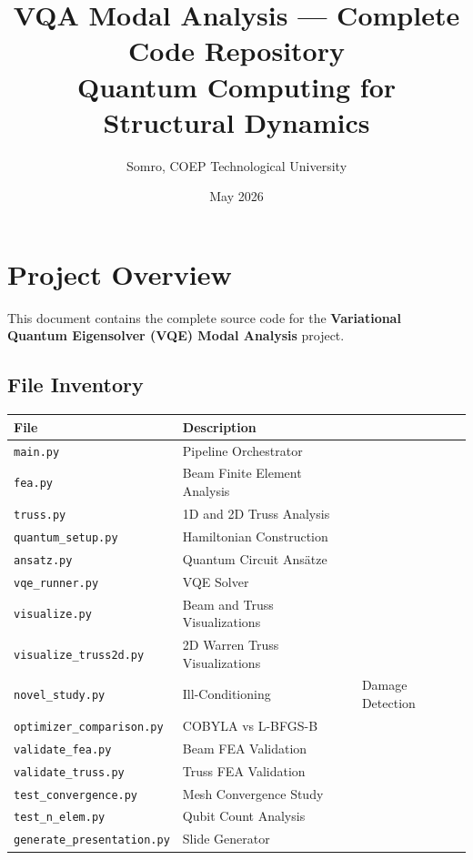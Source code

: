 \documentclass[12pt, a4paper]{article}
\title{\textbf{VQA Modal Analysis --- Complete Code Repository} \\
\large Quantum Computing for Structural Dynamics}
\author{Somro, COEP Technological University}
\date{May 2026}
\newcommand{\code}[1]{\texttt{\small #1}}
\begin{document}
\maketitle
\tableofcontents
\newpage

\section{Project Overview}
This document contains the complete source code for the \textbf{Variational Quantum Eigensolver (VQE) Modal Analysis} project.
\subsection{File Inventory}
\begin{table}[H]
\centering
\begin{tabular}{ll}
\toprule
\textbf{File} & \textbf{Description} \\
\midrule
\code{main.py} & Pipeline Orchestrator \\
\code{fea.py} & Beam Finite Element Analysis \\
\code{truss.py} & 1D and 2D Truss Analysis \\
\code{quantum_setup.py} & Hamiltonian Construction \\
\code{ansatz.py} & Quantum Circuit Ansätze \\
\code{vqe_runner.py} & VQE Solver \\
\code{visualize.py} & Beam and Truss Visualizations \\
\code{visualize_truss2d.py} & 2D Warren Truss Visualizations \\
\code{novel_study.py} & Ill-Conditioning & Damage Detection \\
\code{optimizer_comparison.py} & COBYLA vs L-BFGS-B \\
\code{validate_fea.py} & Beam FEA Validation \\
\code{validate_truss.py} & Truss FEA Validation \\
\code{test_convergence.py} & Mesh Convergence Study \\
\code{test_n_elem.py} & Qubit Count Analysis \\
\code{generate_presentation.py} & Slide Generator \\
\bottomrule
\end{tabular}
\end{table}

\end{document}
